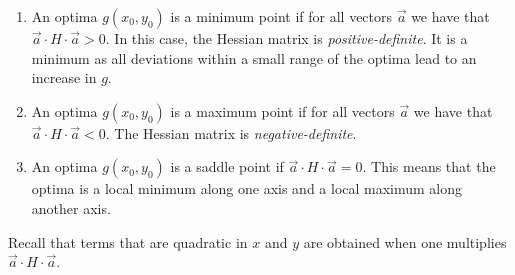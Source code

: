 \documentclass[a4paper, 12pt,oneside,openany]{book}
\begin{document}
\begin{enumerate}
	\item An optima $g(x_0, y_0)$ is a minimum point if for all vectors $\vec{a}$ we have that $\vec{a} \cdot H \cdot \vec{a} >0$. In this case, the Hessian matrix is \emph{positive-definite}. It is a minimum as all deviations within a small range of the optima lead to an increase in $g$.
	\item An optima $g(x_0, y_0)$ is a maximum point if for all vectors $\vec{a}$ we have that $\vec{a} \cdot H \cdot \vec{a} <0$. The Hessian matrix is \emph{negative-definite}.
	\item An optima $g(x_0, y_0)$ is a saddle point if $\vec{a} \cdot H \cdot \vec{a} =0$. This means that the optima is a local minimum along one axis and a local maximum along another axis.
\end{enumerate}

Recall that terms that are quadratic in $x$ and $y$ are obtained when one multiplies $\vec{a} \cdot H \cdot \vec{a}$. 

\end{document}
